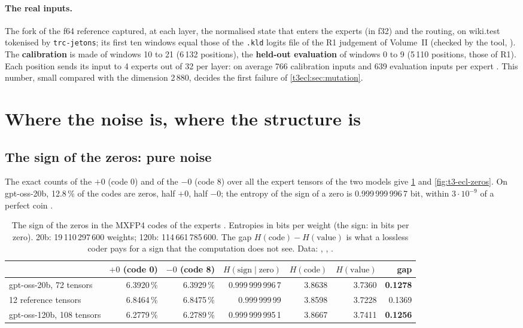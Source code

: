 \paragraph{The real inputs.} The fork of the f64 reference captured, at each layer, the normalised state that enters the experts (in f32) and the routing, on wiki.test tokenised by \texttt{trc-jetons}; its first ten windows equal those of the \texttt{.kld} logits file of the R1 judgement of Volume~II (checked by the tool, ). The \textbf{calibration} is made of windows 10 to 21 (6\,132 positions), the \textbf{held-out evaluation} of windows 0 to 9 (5\,110 positions, those of R1). Each position sends its input to 4 experts out of 32 per layer: on average 766 calibration inputs and 639 evaluation inputs per expert \mes. This number, small compared with the dimension 2\,880, decides the first failure of \cref{t3ecl:sec:mutation}.

\section{Where the noise is, where the structure is}\label{t3ecl:sec:bruit}

\subsection{The sign of the zeros: pure noise}

The exact counts of the $+0$ (code 0) and of the $-0$ (code 8) over all the expert tensors of the two models give \cref{t3ecl:tab:zeros} and \cref{fig:t3-ecl-zeros}. On gpt-oss-20b, 12.8\,\% of the codes are zeros, half $+0$, half $-0$; the entropy of the sign of a zero is 0.999\,999\,996\,7 bit, within $3\cdot10^{-9}$ of a perfect coin \mes.

\begin{table}[tbp]
\centering\footnotesize\setlength{\tabcolsep}{3pt}
\begin{tabular}{l r r r r r r}
\toprule
& $+0$ (code 0) & $-0$ (code 8) & $H(\text{sign}\mid\text{zero})$ & $H(\text{code})$ & $H(\text{value})$ & gap \\
\midrule
gpt-oss-20b, 72 tensors & 6.3920\,\% & 6.3929\,\% & 0.999\,999\,996\,7 & 3.8638 & 3.7360 & \textbf{0.1278} \\
12 reference tensors & 6.8464\,\% & 6.8475\,\% & 0.999\,999\,99 & 3.8598 & 3.7228 & 0.1369 \\
gpt-oss-120b, 108 tensors & 6.2779\,\% & 6.2789\,\% & 0.999\,999\,995\,1 & 3.8667 & 3.7411 & \textbf{0.1256} \\
\bottomrule
\end{tabular}
\caption[The sign of the zeros]{The sign of the zeros in the MXFP4 codes of the experts \mes. Entropies in bits per weight (the sign: in bits per zero). 20b: 19\,110\,297\,600 weights; 120b: 114\,661\,785\,600. The gap $H(\text{code}) - H(\text{value})$ is what a lossless coder pays for a sign that the computation does not see. Data: , , .}
\label{t3ecl:tab:zeros}
\end{table}

